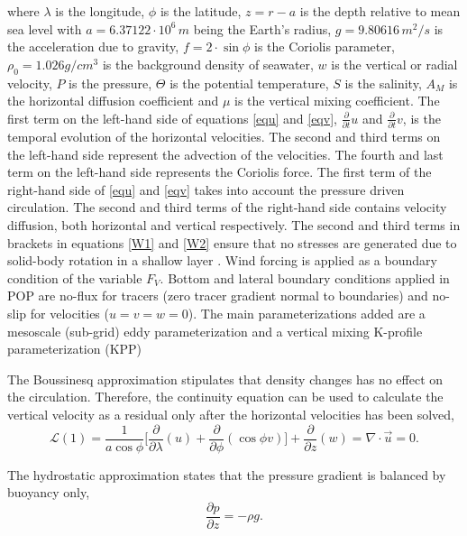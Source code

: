 where $\lambda$ is the longitude, $\phi$ is the latitude, $z=r-a$ is the depth relative to mean sea level with $a=6.37122\cdot10^6\, m$ being the Earth's radius, $g=9.80616\, m^2/s$ is the acceleration due to gravity, $f=2 \cdot \sin \phi$ is the Coriolis parameter, $\rho_0 = 1.026 g/cm^3$ is the background density of seawater, $w$ is the vertical or radial velocity, $P$ is the pressure, $\Theta$ is the potential temperature, $S$ is the salinity, $A_M$ is the horizontal diffusion coefficient and $\mu$ is the vertical mixing coefficient. The first term on the left-hand side of equations \eqref{equ} and \eqref{eqv}, $\frac{\partial}{\partial t} u$ and $\frac{\partial}{\partial t} v$,  is the temporal evolution of the horizontal velocities. The second and third terms on the left-hand side represent the advection of the velocities. The fourth and last term on the left-hand side represents the Coriolis force. The first term of the right-hand side of \eqref{equ} and \eqref{eqv} takes into account the pressure driven circulation. The second and third terms of the right-hand side contains velocity diffusion, both horizontal and vertical respectively. The second and third terms in brackets in equations \eqref{W1} and \eqref{W2} ensure that no stresses are generated due to solid-body rotation in a shallow layer \citep{1972Williams}. Wind forcing is applied as a boundary condition of the variable $F_V$. Bottom and lateral boundary conditions applied in POP are no-flux for tracers (zero tracer gradient normal to boundaries) and no-slip for velocities ($u=v=w=0$). The main parameterizations added are a mesoscale (sub-grid) eddy parameterization \citep{Gent:1990zr} and a vertical mixing K-profile parameterization (KPP) \citep{ROG:ROG1432}

The Boussinesq approximation stipulates that density changes has no effect on the circulation. Therefore, the continuity equation can be used to calculate the vertical velocity as a residual only after the horizontal velocities has been solved,
\begin{equation}
\mathcal{L}(1) = \frac{1}{a \cos\phi} \big[\frac{\partial}{\partial \lambda}(u)+\frac{\partial}{\partial \phi}(\cos\phi v) \big] + \frac{\partial}{\partial z}(w) = \nabla \cdot \vec{u} = 0.
\end{equation}

The hydrostatic approximation states that the pressure gradient is balanced by buoyancy only,
\begin{equation}
\frac{\partial p}{\partial z} = -\rho g.
\end{equation}

